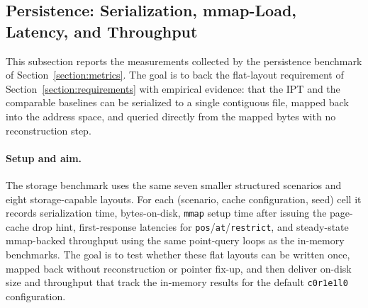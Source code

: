 \documentclass[manuscript,screen,review]{acmart}
\theoremstyle{definition}
\theoremstyle{plain}
\begin{document}
\subsection{Persistence: Serialization, mmap-Load, Latency, and Throughput}
\label{section:results-storage}

This subsection reports the measurements collected by the persistence
benchmark of Section~\ref{section:metrics}. The goal is to back the
flat-layout requirement of Section~\ref{section:requirements} with
empirical evidence: that the IPT and the comparable baselines can be
serialized to a single contiguous file, mapped back into the address
space, and queried directly from the mapped bytes with no
reconstruction step.

\paragraph{Setup and aim.} The storage benchmark uses the same seven
smaller structured scenarios and eight storage-capable layouts. For
each (scenario, cache configuration, seed) cell it records
serialization time, bytes-on-disk, \texttt{mmap} setup time after
issuing the page-cache drop hint, first-response latencies for
\texttt{pos}/\texttt{at}/\texttt{restrict}, and steady-state
mmap-backed throughput using the same point-query loops as the
in-memory benchmarks. The goal is to test whether these flat layouts
can be written once, mapped back without reconstruction or pointer
fix-up, and then deliver on-disk size and throughput that track the
in-memory results for the default \texttt{c0r1e1l0}
configuration.
\end{document}
